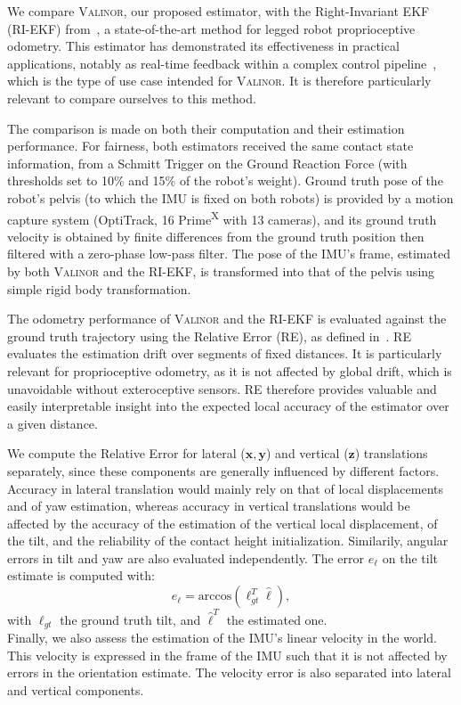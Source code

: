 \documentclass{IJCAS}
\begin{document}
\noindent We compare {\scshape Valinor}, our proposed estimator, with the Right-Invariant EKF (RI-EKF) from~\cite{Hartley2020RIEKF}, a state-of-the-art method for legged robot proprioceptive odometry. This estimator has demonstrated its effectiveness in practical applications, notably as real-time feedback within a complex control pipeline~\cite{Grandia2024DesignControlBipedalRoboticCharacter}, which is the type of use case intended for {\scshape Valinor}. It is therefore particularly relevant to compare ourselves to this method.

The comparison is made on both their computation and their estimation performance. For fairness, both estimators received the same contact state information, from a Schmitt Trigger on the Ground Reaction Force (with thresholds set to 10\% and 15\% of the robot's weight).
Ground truth pose of the robot's pelvis (to which the IMU is fixed on both robots) is provided by a motion capture system (OptiTrack, 16 Prime\textsuperscript{X} with 13 cameras), and its ground truth velocity is obtained by finite differences from the ground truth position then filtered with a zero-phase low-pass filter. The pose of the IMU's frame, estimated by both {\scshape Valinor} and the RI-EKF, is transformed into that of the pelvis using simple rigid body transformation.

The odometry performance of {\scshape Valinor} and the RI-EKF is evaluated against the ground truth trajectory using the Relative Error (RE), as defined in~\cite{Zhang2018QuantitativeTrajectoryEvaluation}. RE evaluates the estimation drift over segments of fixed distances. It is particularly relevant for proprioceptive odometry, as it is not affected by global drift, which is unavoidable without exteroceptive sensors. RE therefore provides valuable and easily interpretable insight into the expected local accuracy of the estimator over a given distance.

We compute the Relative Error for lateral ($\boldsymbol{x}, \boldsymbol{y}$) and vertical ($\boldsymbol{z}$) translations separately, since these components are generally influenced by different factors. Accuracy in lateral translation would mainly rely on that of local displacements and of yaw estimation, whereas accuracy in vertical translations would be affected by the accuracy of the estimation of the vertical local displacement, of the tilt, and the reliability of the contact height initialization. Similarily, angular errors in tilt and yaw are also evaluated independently.
The error $e_{\boldsymbol{\ell}}$ on the tilt estimate is computed with:
\begin{equation}
    e_{\boldsymbol{\ell}} = \text{arccos}\left(\boldsymbol{\ell}_{gt}^{T} \hat{\boldsymbol{\ell}} \right),
\end{equation}
with $\boldsymbol{\ell}_{gt}$ the ground truth tilt, and $\hat{\boldsymbol{\ell}}^{T}$ the estimated one.\\
Finally, we also assess the estimation of the IMU's linear velocity in the world. This velocity is expressed in the frame of the IMU such that it is not affected by errors in the orientation estimate. The velocity error is also separated into lateral and vertical components.
\end{document}
